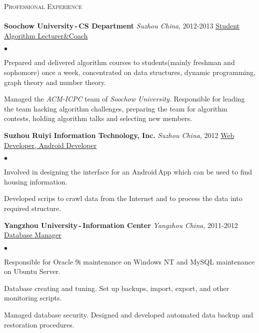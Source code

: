 \documentclass[11pt]{article}
\newcommand{\lineunder}{\vspace*{-8pt} \\ \hspace*{-18pt} \hrulefill \\}
\newcommand{\header}[2]{{\hspace*{-15pt}\vspace*{6pt} \textsc{\large #1}\hfill{\footnotesize #2}} \vspace*{-6pt} \lineunder}
\newcommand{\employer}[4]{{ \textbf{#1} \emph{#2}, #3 \hfill \underline{#4}\\ }}
\newenvironment{achievements}{\begin{list}{$\bullet$}{\topsep 0pt \itemsep -2pt}}{\vspace*{4pt}\end{list}}
\begin{document}

\header{Professional Experience}{}

\employer{Soochow University\,-\,CS Department}{Suzhou China}{2012-2013} {Student Algorithm Lecturer\&Coach}
	\begin{achievements}
    \item Prepared and delivered algorithm courses to students(mainly freshman and sophomore) once a week, concentrated on
        data structures, dynamic programming, graph theory and number theory.
    \item Managed the \emph{ACM-ICPC} team of \emph{Soochow University}. Responsible for leading the team hacking algorithm
        challenges, preparing the team for algorithm contests, holding algorithm talks and selecting new members.
	\end{achievements}

\employer{Suzhou Ruiyi Information Technology, Inc.}{Suzhou China}{2012}{Web Developer, Android Developer}
	\begin{achievements}
    \item Involved in designing the interface for an Android\,App which can be used to find housing information.
	\item Developed scrips to crawl data from the Internet and to process the data into required structure.
	\end{achievements}

\employer{Yangzhou University\,-\,Information Center}{Yangzhou China}{2011-2012}{Database Manager}
	\begin{achievements}
    \item Responsible for Oracle 9i maintenance on Windows NT and MySQL maintenance on Ubuntu Server.
    \item Database creating and tuning. Set up backups, import, export, and other monitoring scripts.
    \item Managed database security. Designed and developed automated data backup and restoration procedures.

	\end{achievements}
\end{document}

